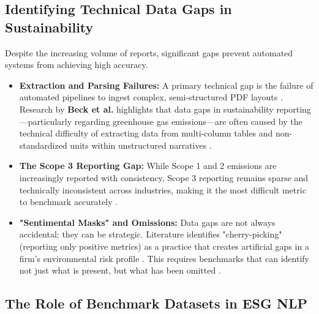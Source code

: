 \subsection{Identifying Technical Data Gaps in Sustainability}

Despite the increasing volume of reports, significant gaps prevent automated systems from achieving high accuracy.
\begin{itemize}
\item 

\textbf{Extraction and Parsing Failures:} A primary technical gap is the failure of automated pipelines to ingest complex, semi-structured PDF layouts  \parencite[]{marco_bronzini_bf94d949, jacob_beck_9548a833}. Research by \textbf{Beck et al.} highlights that data gaps in sustainability reporting—particularly regarding greenhouse gas emissions—are often caused by the technical difficulty of extracting data from multi-column tables and non-standardized units within unstructured narratives  \parencite{jacob_beck_9548a833}.\item 

\textbf{The Scope 3 Reporting Gap:} While Scope 1 and 2 emissions are increasingly reported with consistency, Scope 3 reporting remains sparse and technically inconsistent across industries, making it the most difficult metric to benchmark accurately  \parencite{jacob_beck_9548a833}.\item 

\textbf{"Sentimental Masks" and Omissions:} Data gaps are not always accidental; they can be strategic. Literature identifies "cherry-picking" (reporting only positive metrics) as a practice that creates artificial gaps in a firm’s environmental risk profile  \parencite[]{xiaojia_wang_02351a60, julia_bingler_268445e3}. This requires benchmarks that can identify not just what is present, but what has been omitted  \parencite{julia_bingler_268445e3}.
\end{itemize}
\subsection{The Role of Benchmark Datasets in ESG NLP}

